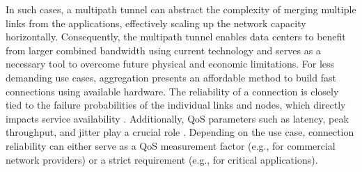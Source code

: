 In such cases, a multipath tunnel can abstract the complexity of merging multiple links from the applications, effectively scaling up the network capacity horizontally. 
Consequently, the multipath tunnel enables data centers to benefit from larger combined bandwidth using current technology and serves as a necessary tool to overcome future physical and economic limitations.
For less demanding use cases, aggregation presents an affordable method to build fast connections using available hardware.
%
The reliability of a connection is closely tied to the failure probabilities of the individual links and nodes, which directly impacts service availability \cite{shooman_algorithms_1995}. 
Additionally, \ac{QoS} parameters such as latency, peak throughput, and jitter play a crucial role \cite{gozdecki_quality_2003}.
Depending on the use case, connection reliability can either serve as a \ac{QoS} measurement factor (e.g., for commercial network providers) or a strict requirement (e.g., for critical applications). 

